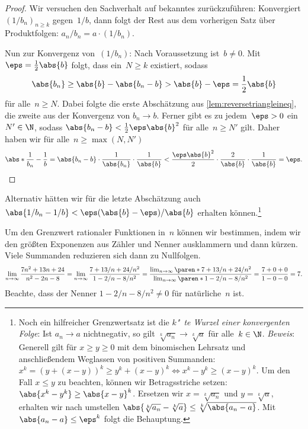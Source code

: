 \documentclass[a4paper]{article}
\begin{document}
\begin{proof}
    Wir versuchen den Sachverhalt auf bekanntes zurückzuführen: Konvergiert $(1/b_n)_{n \geq k}$ gegen~$1/b$, dann folgt der Rest aus dem vorherigen Satz über Produktfolgen: $a_n/b_n = a \cdot (1/b_n)$.

    Nun zur Konvergenz von~$(1/b_n)$: Nach Voraussetzung ist~$b \neq 0$. Mit~$\eps = \frac{1}{2}\abs{b}$ folgt, dass ein~$N \geq k$ existiert, sodass
    \begin{align*}
        \abs{b_n} \geq \abs{b} - \abs{b_n-b} > \abs{b} - \eps = \frac{1}{2}\abs{b}
    \end{align*}
    für alle~$n \geq N$. Dabei folgte die erste Abschätzung aus \cref{lem:reversetriangleineq}, die zweite aus der Konvergenz von $b_n \to b$. Ferner gibt es zu jedem~$\eps > 0$ ein~$N' \in \N$, sodass $\abs{b_n-b} < \frac{1}{2} \eps \abs{b}^2$ für alle~$n \geq N'$ gilt. Daher haben wir für alle~$n \geq \max(N, N')$
    \begin{equation*}
        \abs*{\frac{1}{b_n} - \frac{1}{b}} = \abs{b_n-b} \cdot \frac{1}{\abs{b_n}} \cdot \frac{1}{\abs{b}} < \frac{\eps \abs{b}^2}{2} \cdot \frac{2}{\abs{b}} \cdot \frac{1}{\abs{b}} = \eps. \qedhere
    \end{equation*}
\end{proof}

Alternativ hätten wir für die letzte Abschätzung auch $\abs{1/b_n - 1/b} < \eps (\abs{b} - \eps) / \abs{b}$ erhalten können.\footnote{Noch ein hilfreicher Grenzwertsatz ist die \emph{$k$"~te Wurzel einer konvergenten Folge}: Ist $a_n \to a$ nichtnegativ, so gilt $\sqrt[k]{a_n} \to \sqrt[k]{a}$ für alle~$k \in \N$. \emph{Beweis}: Generell gilt für $x \geq y \geq 0$ mit dem binomischen Lehrsatz und anschließendem Weglassen von positiven Summanden: $x^k = (y+(x-y))^k \geq y^k + (x-y)^k \iff x^k-y^k \geq (x-y)^k$. Um den Fall $x \leq y$ zu beachten, können wir Betragsstriche setzen: $\abs{x^k-y^k} \geq \abs{x-y}^k$. Ersetzen wir $x = \sqrt[k]{a_n}$ und $y = \sqrt[k]{a}$, erhalten wir nach umstellen $\abs{\sqrt[k]{a_n}-\sqrt[k]{a}} \leq \sqrt[k]{\abs{a_n-a}}$. Mit $\abs{a_n-a} \leq \eps^k$ folgt die Behauptung.}

\begin{example}
    Um den Grenzwert rationaler Funktionen in~$n$ können wir bestimmen, indem wir den größten Exponenzen aus Zähler und Nenner ausklammern und dann kürzen. Viele Summanden reduzieren sich dann zu Nullfolgen.
    \begin{equation*}
        \lim_{n\to\infty} \frac{7n^2 + 13n + 24}{n^2 - 2n - 8} = \lim_{n\to\infty} \frac{7 + 13/n + 24/n^2}{1 - 2/n - 8/n^2} = \frac{\lim_{n\to\infty} \paren*{7 + 13/n + 24/n^2}}{\lim_{n\to\infty} \paren*{1 - 2/n - 8/n^2}} = \frac{7 + 0 + 0}{1 - 0 - 0} = 7.
    \end{equation*}
    Beachte, dass der Nenner $1 - 2/n - 8/n^2 \neq 0$ für natürliche~$n$ ist.
\end{example}
\end{document}
